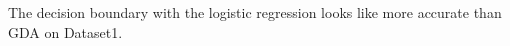\begin{answer}
 The decision boundary with the logistic regression looks like more accurate than GDA on Dataset1.  
\end{answer}
